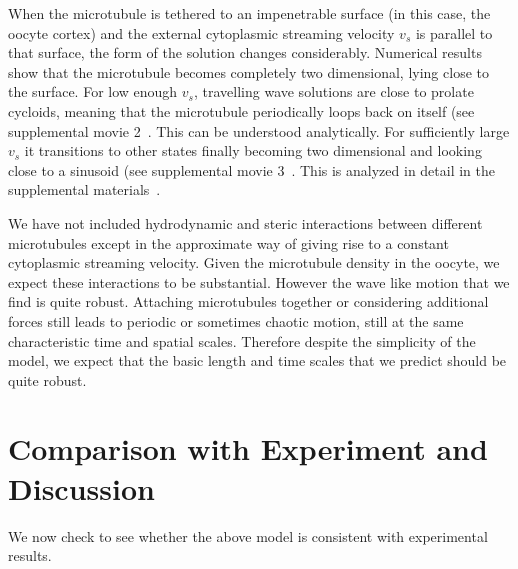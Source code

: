\documentclass[11pt]{ucthesis}
\begin{document}
When the microtubule is tethered to an impenetrable surface (in this case, the oocyte cortex) and the external cytoplasmic streaming velocity $v_s$
is parallel to that surface, the form of the solution changes considerably. Numerical results show that the microtubule becomes completely two dimensional,
lying close to the surface. For low enough $v_s$, travelling wave
solutions are close to prolate cycloids, meaning that the microtubule periodically loops back
on itself (see supplemental movie 2~\cite{SupplMovies}. This can be understood analytically. For sufficiently large $v_s$ it transitions to other states finally becoming 
two dimensional and looking close to a sinusoid (see supplemental movie 3~\cite{SupplMovies}. This is analyzed in detail in
the supplemental materials~\cite{SupplMat}.

We have not included hydrodynamic and steric interactions between
different microtubules except in the approximate way of giving rise to
a constant cytoplasmic streaming velocity. Given the microtubule density in the
oocyte, we expect these interactions to be substantial. However the wave
like motion that we find is quite robust. Attaching microtubules together or
considering additional forces still leads to periodic or sometimes chaotic
motion, still at the same characteristic time and spatial scales. Therefore
despite the simplicity of the model, we expect that the basic length
and time scales that we predict should be quite robust.

\section{Comparison with Experiment and Discussion}

We now check to see whether the above model is consistent with experimental
results.  
\end{document}
